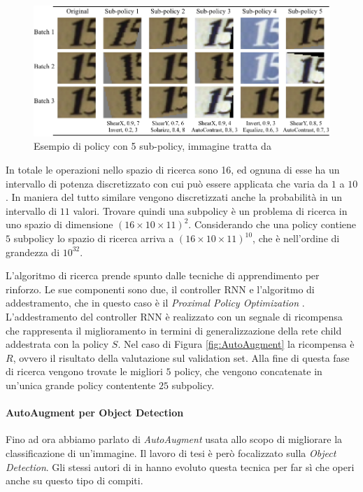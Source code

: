 \begin{figure}[]
    \centering
    \includegraphics[width=\textwidth]{images/svhn_viz_policy2.png}
    \caption{Esempio di policy con 5 sub-policy, immagine tratta da \cite{DBLP:journals/corr/abs-1805-09501}}
    \label{fig:policy}
\end{figure} 


In totale le operazioni nello spazio di ricerca sono 16, ed ognuna di esse ha un intervallo di potenza discretizzato con cui può essere applicata che varia da $1$ a $10$. In maniera del tutto similare vengono discretizzati anche la probabilità in un intervallo di $11$ valori. Trovare quindi una subpolicy è un problema di ricerca in uno spazio di dimensione $(16 \times 10 \times 11)^2$. Considerando che una policy contiene $5$ subpolicy lo spazio di ricerca arriva a $(16 \times 10 \times 11)^{10}$, che è nell'ordine di grandezza di $10^{32}$.


L'algoritmo di ricerca prende spunto dalle tecniche di apprendimento per rinforzo. Le sue componenti sono due, il controller \ac{RNN} e l'algoritmo di addestramento, che in questo caso è il \textit{Proximal Policy Optimization} \cite{DBLP:journals/corr/SchulmanWDRK17}. L'addestramento del controller \ac{RNN} è realizzato con un segnale di ricompensa che rappresenta il miglioramento in termini di generalizzazione della rete child addestrata con la policy $S$. Nel caso di Figura \ref{fig:AutoAugment} la ricompensa è $R$, ovvero il risultato della valutazione sul validation set. Alla fine di questa fase di ricerca vengono trovate le migliori $5$ policy, che vengono concatenate in un'unica grande policy contentente $25$ subpolicy.
\paragraph{AutoAugment per Object Detection}
Fino ad ora abbiamo parlato di \textit{AutoAugment} usata allo scopo di migliorare la classificazione di un'immagine. Il lavoro di tesi è però focalizzato sulla \textit{Object Detection}. Gli stessi autori di \cite{DBLP:journals/corr/abs-1805-09501} in \cite{DBLP:journals/corr/abs-1906-11172} hanno evoluto questa tecnica per far sì che operi anche su questo tipo di compiti.


